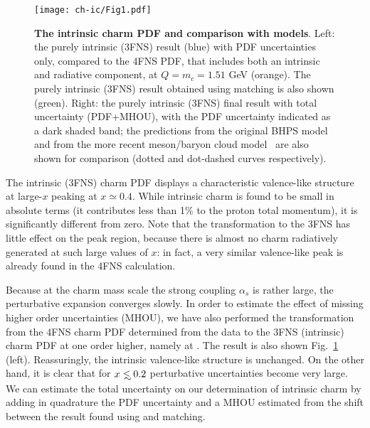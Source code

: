 \begin{figure}[h]
  \begin{center}
    \texttt{[image: ch-ic/Fig1.pdf]}
    \caption{\small  \textbf{ The intrinsic charm PDF
      and comparison with models}.
%
      Left: the purely
      intrinsic (3FNS) result (blue)
      with PDF uncertainties only, compared to the 4FNS PDF, that
      includes both an intrinsic and radiative
      component,   at
      $Q=m_c=1.51$ GeV (orange). The purely intrinsic (3FNS)
      result obtained using \nnnlo matching is also shown (green).
      Right: the purely
      intrinsic (3FNS)
      final result with total uncertainty (PDF+MHOU), with the PDF
      uncertainty indicated as a dark shaded band;
the predictions from the original 
BHPS model~\cite{Brodsky:1980pb} and from the more recent meson/baryon
      cloud model~\cite{Hobbs:2013bia} are also shown for comparison
      (dotted and dot-dashed curves respectively).
         \label{fig:ic/charm_content_3fns} }
\end{center}
\end{figure}

The intrinsic (3FNS) charm PDF
displays a characteristic valence-like
 structure at large-$x$ peaking at $x\simeq 0.4$.
%
 While intrinsic charm is found to be small in absolute terms
 (it contributes less than 1\% to the proton  total momentum),
 it is significantly different from zero.
%
 Note that the transformation to the 3FNS has little effect on the peak region,
 because there is almost no charm radiatively generated at such large values of $x$: in
 fact, a very similar valence-like peak is already found in the 4FNS calculation.

Because at the charm mass scale the strong coupling $\alpha_s$ is rather
large, the perturbative expansion converges slowly.
%
In order to
estimate the effect of missing higher order uncertainties (MHOU), we
have also performed the transformation from the 4FNS \nnlo charm PDF
determined from the data to the 3FNS (intrinsic) charm PDF at one
order higher, namely at \nnnlo. 
%
The result is also shown
Fig.~\ref{fig:ic/charm_content_3fns} (left). Reassuringly, the intrinsic
valence-like structure is unchanged.
%
On the other hand, it is clear that for
$x\lsim 0.2$ perturbative uncertainties become very large.
%
We can estimate  the total uncertainty on our determination
of intrinsic charm by adding in quadrature the PDF uncertainty and a
MHOU estimated from the shift between the result found using \nnlo
and \nnnlo matching.

